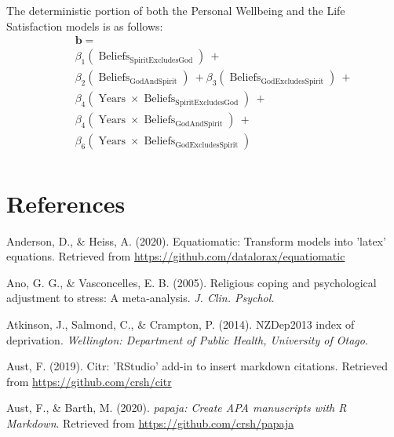 \documentclass[
  english,
  man,floatsintext]{apa6}
\begin{document}
The deterministic portion of both the Personal Wellbeing and the Life Satisfaction models is as follows:
\[
\begin{aligned}
& \quad  \boldsymbol{b} = \\
& \quad \beta_{1}(\operatorname{Beliefs}_{\operatorname{SpiritExcludesGod}})\ + \\
&\quad \beta_{2}(\operatorname{Beliefs}_{\operatorname{GodAndSpirit}})\ +  \beta_{3}(\operatorname{Beliefs}_{\operatorname{GodExcludesSpirit}})\ +\\
& \quad \beta_{4}(\operatorname{Years} \times \operatorname{Beliefs}_{\operatorname{SpiritExcludesGod}})\ + \\ 
& \quad \beta_{4}(\operatorname{Years} \times \operatorname{Beliefs}_{\operatorname{GodAndSpirit}})\ + \\
&\quad \beta_{6}(\operatorname{Years} \times \operatorname{Beliefs}_{\operatorname{GodExcludesSpirit}}) \\ 
\end{aligned}
\]
\newpage

\hypertarget{references}{%
\section{References}\label{references}}

\begingroup
\setlength{\parindent}{-0.5in}
\setlength{\leftskip}{0.5in}

\hypertarget{refs}{}
\leavevmode\hypertarget{ref-R-equatiomatic}{}%
Anderson, D., \& Heiss, A. (2020). Equatiomatic: Transform models into 'latex' equations. Retrieved from \url{https://github.com/datalorax/equatiomatic}

\leavevmode\hypertarget{ref-Ano2005-hx}{}%
Ano, G. G., \& Vasconcelles, E. B. (2005). Religious coping and psychological adjustment to stress: A meta‐analysis. \emph{J. Clin. Psychol.}

\leavevmode\hypertarget{ref-Atkinson2014-ex}{}%
Atkinson, J., Salmond, C., \& Crampton, P. (2014). NZDep2013 index of deprivation. \emph{Wellington: Department of Public Health, University of Otago}.

\leavevmode\hypertarget{ref-R-citr}{}%
Aust, F. (2019). Citr: 'RStudio' add-in to insert markdown citations. Retrieved from \url{https://github.com/crsh/citr}

\leavevmode\hypertarget{ref-R-papaja}{}%
Aust, F., \& Barth, M. (2020). \emph{papaja: Create APA manuscripts with R Markdown}. Retrieved from \url{https://github.com/crsh/papaja}
\end{document}
